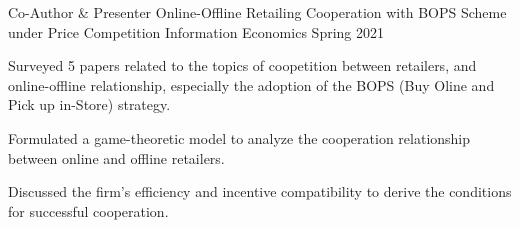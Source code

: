 \begin{cventries}
  \cventry
    {Co-Author \& Presenter}
    {Online-Offline Retailing Cooperation with BOPS Scheme under Price Competition}
    {Information Economics}
    {Spring 2021}
    {
        \begin{cvitems}
        \item Surveyed 5 papers related to the topics of coopetition between retailers,
            and online-offline relationship, especially the adoption of the BOPS 
            (Buy Oline and Pick up in-Store) strategy.
            \item Formulated a game-theoretic model to analyze the cooperation relationship
                between online and offline retailers.
            \item Discussed the firm's efficiency and incentive compatibility to
                derive the conditions for successful cooperation.
        \end{cvitems}
    }



\end{cventries}
